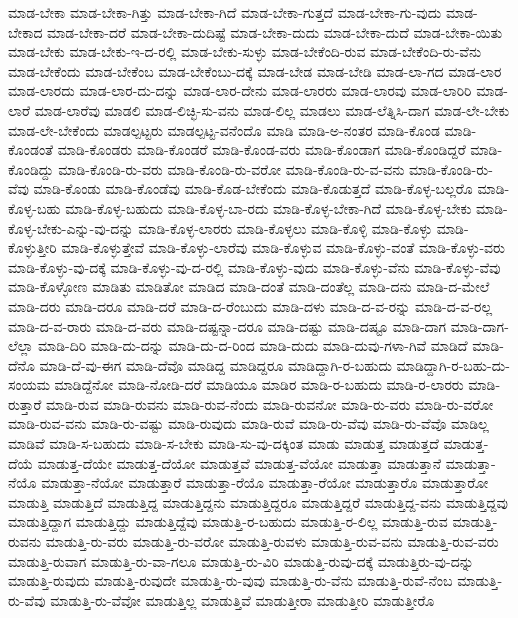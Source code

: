 {ಮಾಡ-ಬೇಕಾ
ಮಾಡ-ಬೇಕಾ-ಗಿತ್ತು
ಮಾಡ-ಬೇಕಾ-ಗಿದೆ
ಮಾಡ-ಬೇಕಾ-ಗುತ್ತದೆ
ಮಾಡ-ಬೇಕಾ-ಗು-ವುದು
ಮಾಡ-ಬೇಕಾದ
ಮಾಡ-ಬೇಕಾ-ದರೆ
ಮಾಡ-ಬೇಕಾ-ದುದಿಷ್ಟೆ
ಮಾಡ-ಬೇಕಾ-ದುದು
ಮಾಡ-ಬೇಕಾ-ದುದೆ
ಮಾಡ-ಬೇಕಾ-ಯಿತು
ಮಾಡ-ಬೇಕು
ಮಾಡ-ಬೇಕು-ಇ-ದ-ರಲ್ಲಿ
ಮಾಡ-ಬೇಕು-ಸುಳ್ಳು
ಮಾಡ-ಬೇಕೆಂದಿ-ರುವ
ಮಾಡ-ಬೇಕೆಂದಿ-ರು-ವೆನು
ಮಾಡ-ಬೇಕೆಂದು
ಮಾಡ-ಬೇಕೆಂಬ
ಮಾಡ-ಬೇಕೆಂಬು-ದಕ್ಕೆ
ಮಾಡ-ಬೇಡ
ಮಾಡ-ಬೇಡಿ
ಮಾಡ-ಲಾ-ಗದ
ಮಾಡ-ಲಾರ
ಮಾಡ-ಲಾರದು
ಮಾಡ-ಲಾರ-ದು-ದನ್ನು
ಮಾಡ-ಲಾರ-ದೇನು
ಮಾಡ-ಲಾರರು
ಮಾಡ-ಲಾರವು
ಮಾಡ-ಲಾರಿರಿ
ಮಾಡ-ಲಾರೆ
ಮಾಡ-ಲಾರೆವು
ಮಾಡಲಿ
ಮಾಡ-ಲಿಚ್ಛಿ-ಸು-ವನು
ಮಾಡ-ಲಿಲ್ಲ
ಮಾಡಲು
ಮಾಡ-ಲೆತ್ನಿಸಿ-ದಾಗ
ಮಾಡ-ಲೇ-ಬೇಕು
ಮಾಡ-ಲೇ-ಬೇಕೆಂದು
ಮಾಡಲ್ಪಟ್ಟರು
ಮಾಡಲ್ಪಟ್ಟ-ವನೆಂದೊ
ಮಾಡಿ
ಮಾಡಿ-ಅ-ನಂತರ
ಮಾಡಿ-ಕೊಂಡ
ಮಾಡಿ-ಕೊಂಡಂತೆ
ಮಾಡಿ-ಕೊಂಡರು
ಮಾಡಿ-ಕೊಂಡರೆ
ಮಾಡಿ-ಕೊಂಡ-ವರು
ಮಾಡಿ-ಕೊಂಡಾಗ
ಮಾಡಿ-ಕೊಂಡಿದ್ದರೆ
ಮಾಡಿ-ಕೊಂಡಿದ್ದು
ಮಾಡಿ-ಕೊಂಡಿ-ರು-ವರು
ಮಾಡಿ-ಕೊಂಡಿ-ರು-ವರೋ
ಮಾಡಿ-ಕೊಂಡಿ-ರು-ವ-ವನು
ಮಾಡಿ-ಕೊಂಡಿ-ರು-ವೆವು
ಮಾಡಿ-ಕೊಂಡು
ಮಾಡಿ-ಕೊಂಡೆವು
ಮಾಡಿ-ಕೊಡ-ಬೇಕೆಂದು
ಮಾಡಿ-ಕೊಡುತ್ತದೆ
ಮಾಡಿ-ಕೊಳ್ಳ-ಬಲ್ಲರೊ
ಮಾಡಿ-ಕೊಳ್ಳ-ಬಹು
ಮಾಡಿ-ಕೊಳ್ಳ-ಬಹುದು
ಮಾಡಿ-ಕೊಳ್ಳ-ಬಾ-ರದು
ಮಾಡಿ-ಕೊಳ್ಳ-ಬೇಕಾ-ಗಿದೆ
ಮಾಡಿ-ಕೊಳ್ಳ-ಬೇಕು
ಮಾಡಿ-ಕೊಳ್ಳ-ಬೇಕು-ಎನ್ನು-ವು-ದನ್ನು
ಮಾಡಿ-ಕೊಳ್ಳ-ಲಾರರು
ಮಾಡಿ-ಕೊಳ್ಳಲು
ಮಾಡಿ-ಕೊಳ್ಳಿ
ಮಾಡಿ-ಕೊಳ್ಳು
ಮಾಡಿ-ಕೊಳ್ಳುತ್ತೀರಿ
ಮಾಡಿ-ಕೊಳ್ಳುತ್ತೇವೆ
ಮಾಡಿ-ಕೊಳ್ಳು-ಲಾರೆವು
ಮಾಡಿ-ಕೊಳ್ಳುವ
ಮಾಡಿ-ಕೊಳ್ಳು-ವಂತೆ
ಮಾಡಿ-ಕೊಳ್ಳು-ವರು
ಮಾಡಿ-ಕೊಳ್ಳು-ವು-ದಕ್ಕೆ
ಮಾಡಿ-ಕೊಳ್ಳು-ವು-ದ-ರಲ್ಲಿ
ಮಾಡಿ-ಕೊಳ್ಳು-ವುದು
ಮಾಡಿ-ಕೊಳ್ಳು-ವೆನು
ಮಾಡಿ-ಕೊಳ್ಳು-ವೆವು
ಮಾಡಿ-ಕೊಳ್ಳೋಣ
ಮಾಡಿತು
ಮಾಡಿತೋ
ಮಾಡಿದ
ಮಾಡಿ-ದಂತೆ
ಮಾಡಿ-ದಂತೆಲ್ಲ
ಮಾಡಿ-ದನು
ಮಾಡಿ-ದ-ಮೇಲೆ
ಮಾಡಿ-ದರು
ಮಾಡಿ-ದರೂ
ಮಾಡಿ-ದರೆ
ಮಾಡಿ-ದ-ರೆಂಬುದು
ಮಾಡಿ-ದಳು
ಮಾಡಿ-ದ-ವ-ರನ್ನು
ಮಾಡಿ-ದ-ವ-ರಲ್ಲ
ಮಾಡಿ-ದ-ವ-ರಾರು
ಮಾಡಿ-ದ-ವರು
ಮಾಡಿ-ದಷ್ಟನ್ನಾ-ದರೂ
ಮಾಡಿ-ದಷ್ಟು
ಮಾಡಿ-ದಷ್ಟೂ
ಮಾಡಿ-ದಾಗ
ಮಾಡಿ-ದಾಗ-ಲೆಲ್ಲಾ
ಮಾಡಿ-ದಿರಿ
ಮಾಡಿ-ದು-ದನ್ನು
ಮಾಡಿ-ದು-ದ-ರಿಂದ
ಮಾಡಿ-ದುದು
ಮಾಡಿ-ದುವು-ಗಳಾ-ಗಿವೆ
ಮಾಡಿದೆ
ಮಾಡಿ-ದೆನೊ
ಮಾಡಿ-ದೆ-ವು-ಈಗ
ಮಾಡಿ-ದೆವೊ
ಮಾಡಿದ್ದ
ಮಾಡಿದ್ದರೂ
ಮಾಡಿದ್ದಾಗಿ-ರ-ಬಹುದು
ಮಾಡಿದ್ದಾಗಿ-ರ-ಬಹು-ದು-ಸಂಯಮ
ಮಾಡಿದ್ದೆನೋ
ಮಾಡಿ-ನೋಡಿ-ದರೆ
ಮಾಡಿಯೂ
ಮಾಡಿರ
ಮಾಡಿ-ರ-ಬಹುದು
ಮಾಡಿ-ರ-ಲಾರರು
ಮಾಡಿ-ರುತ್ತಾರೆ
ಮಾಡಿ-ರುವ
ಮಾಡಿ-ರುವನು
ಮಾಡಿ-ರುವ-ನೆಂದು
ಮಾಡಿ-ರುವನೋ
ಮಾಡಿ-ರು-ವರು
ಮಾಡಿ-ರು-ವರೋ
ಮಾಡಿ-ರುವ-ವನು
ಮಾಡಿ-ರು-ವಷ್ಟು
ಮಾಡಿ-ರುವುದು
ಮಾಡಿ-ರುವೆ
ಮಾಡಿ-ರು-ವೆವು
ಮಾಡಿ-ರು-ವೆವೊ
ಮಾಡಿಲ್ಲ
ಮಾಡಿವೆ
ಮಾಡಿ-ಸ-ಬಹುದು
ಮಾಡಿ-ಸ-ಬೇಕು
ಮಾಡಿ-ಸು-ವು-ದಕ್ಕಿಂತ
ಮಾಡು
ಮಾಡುತ್ತ
ಮಾಡುತ್ತದೆ
ಮಾಡುತ್ತ-ದೆಯೆ
ಮಾಡುತ್ತ-ದೆಯೇ
ಮಾಡುತ್ತ-ದೆಯೋ
ಮಾಡುತ್ತವೆ
ಮಾಡುತ್ತ-ವೆಯೋ
ಮಾಡುತ್ತಾ
ಮಾಡುತ್ತಾನೆ
ಮಾಡುತ್ತಾ-ನೆಯೊ
ಮಾಡುತ್ತಾ-ನೆಯೋ
ಮಾಡುತ್ತಾರೆ
ಮಾಡುತ್ತಾ-ರೆಯೊ
ಮಾಡುತ್ತಾ-ರೆಯೋ
ಮಾಡುತ್ತಾರೊ
ಮಾಡುತ್ತಾರೋ
ಮಾಡುತ್ತಿ
ಮಾಡುತ್ತಿದೆ
ಮಾಡುತ್ತಿದ್ದ
ಮಾಡುತ್ತಿದ್ದನು
ಮಾಡುತ್ತಿದ್ದರೂ
ಮಾಡುತ್ತಿದ್ದರೆ
ಮಾಡುತ್ತಿದ್ದ-ವನು
ಮಾಡುತ್ತಿದ್ದವು
ಮಾಡುತ್ತಿದ್ದಾಗ
ಮಾಡುತ್ತಿದ್ದು
ಮಾಡುತ್ತಿದ್ದೆವು
ಮಾಡುತ್ತಿ-ರ-ಬಹುದು
ಮಾಡುತ್ತಿ-ರ-ಲಿಲ್ಲ
ಮಾಡುತ್ತಿ-ರುವ
ಮಾಡುತ್ತಿ-ರುವನು
ಮಾಡುತ್ತಿ-ರು-ವರು
ಮಾಡುತ್ತಿ-ರು-ವರೋ
ಮಾಡುತ್ತಿ-ರುವಳು
ಮಾಡುತ್ತಿ-ರುವ-ವನು
ಮಾಡುತ್ತಿ-ರುವ-ವರು
ಮಾಡುತ್ತಿ-ರುವಾಗ
ಮಾಡುತ್ತಿ-ರು-ವಾ-ಗಲೂ
ಮಾಡುತ್ತಿ-ರು-ವಿರಿ
ಮಾಡುತ್ತಿ-ರುವು-ದಕ್ಕೆ
ಮಾಡುತ್ತಿರು-ವು-ದನ್ನು
ಮಾಡುತ್ತಿ-ರುವುದು
ಮಾಡುತ್ತಿ-ರುವುದೇ
ಮಾಡುತ್ತಿ-ರು-ವುವು
ಮಾಡುತ್ತಿ-ರು-ವೆನು
ಮಾಡುತ್ತಿ-ರುವೆ-ನೆಂಬ
ಮಾಡುತ್ತಿ-ರು-ವೆವು
ಮಾಡುತ್ತಿ-ರು-ವೆವೋ
ಮಾಡುತ್ತಿಲ್ಲ
ಮಾಡುತ್ತಿವೆ
ಮಾಡುತ್ತೀರಾ
ಮಾಡುತ್ತೀರಿ
ಮಾಡುತ್ತೀರೊ
}
